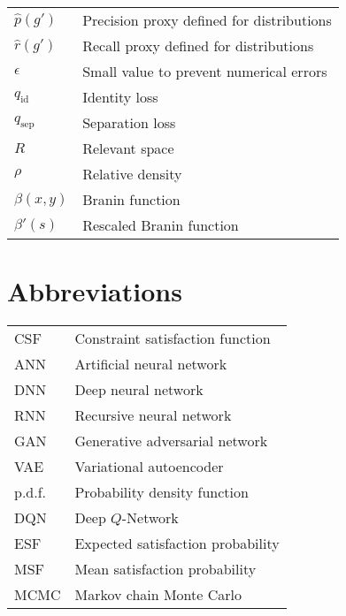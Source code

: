 \documentclass[../main.tex]{subfiles}
\begin{document}
\begin{longtable}[l]{ l l }
    $\hat{p}(g')$ & Precision proxy defined for distributions \\
    $\hat{r}(g')$ & Recall proxy defined for distributions \\
    $\epsilon$ & Small value to prevent numerical errors \\
    $q_\text{id}$ & Identity loss \\
    $q_\text{sep}$ & Separation loss \\
    $R$ & Relevant space \\
    $\rho$ & Relative density \\
    $\beta(x,y)$ & Branin function \\
    $\beta'(s)$ & Rescaled Branin function \\
\end{longtable}

\pagebreak

\section*{Abbreviations}

\begin{longtable}[l]{ l l }
    CSF & Constraint satisfaction function \\
    ANN & Artificial neural network \\
    DNN & Deep neural network \\
    RNN & Recursive neural network \\
    GAN & Generative adversarial network \\
    VAE & Variational autoencoder \\
    p.d.f. & Probability density function \\
    DQN & Deep $Q$-Network \\
    ESF & Expected satisfaction probability \\
    MSF & Mean satisfaction probability \\
    MCMC & Markov chain Monte Carlo \\
\end{longtable}
\end{document}
